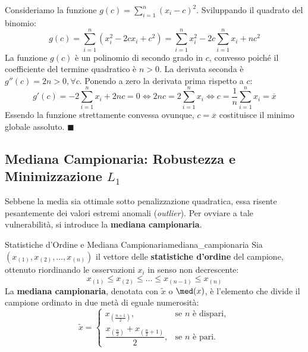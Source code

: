 \begin{dimostrazione}
Consideriamo la funzione $g(c) = \sum_{i=1}^n (x_i - c)^2$. Sviluppando il quadrato del binomio:
\begin{equation}
g(c) = \sum_{i=1}^n \left(x_i^2 - 2c x_i + c^2\right) = \sum_{i=1}^n x_i^2 - 2c \sum_{i=1}^n x_i + n c^2
\end{equation}
La funzione $g(c)$ è un polinomio di secondo grado in $c$, convesso poiché il coefficiente del termine quadratico è $n > 0$. La derivata seconda è $g''(c) = 2n > 0, \forall c$. Ponendo a zero la derivata prima rispetto a $c$:
\begin{equation}
g'(c) = -2\sum_{i=1}^n x_i + 2nc = 0 \iff 2nc = 2\sum_{i=1}^n x_i \iff c = \frac{1}{n}\sum_{i=1}^n x_i = \overline{x}
\end{equation}
Essendo la funzione strettamente convessa ovunque, $c = \overline{x}$ costituisce il minimo globale assoluto. $\blacksquare$
\end{dimostrazione}

\subsection{Mediana Campionaria: Robustezza e Minimizzazione $L_1$}

Sebbene la media sia ottimale sotto penalizzazione quadratica, essa risente pesantemente dei valori estremi anomali (\emph{outlier}). Per ovviare a tale vulnerabilità, si introduce la \textbf{mediana campionaria}.

\begin{definizione}{Statistiche d'Ordine e Mediana Campionaria}{mediana_campionaria}
Sia $(x_{(1)}, x_{(2)}, \dots, x_{(n)})$ il vettore delle \textbf{statistiche d'ordine} del campione, ottenuto riordinando le osservazioni $x_i$ in senso non decrescente:
\begin{equation}
x_{(1)} \le x_{(2)} \le \dots \le x_{(n-1)} \le x_{(n)}
\end{equation}
La \textbf{mediana campionaria}, denotata con $\widetilde{x}$ o $\med(x)$, è l'elemento che divide il campione ordinato in due metà di eguale numerosità:
\begin{equation}
\widetilde{x} = \begin{cases}
x_{\left(\frac{n+1}{2}\right)}, & \text{se } n \text{ è dispari}, \\[8pt]
\dfrac{x_{\left(\frac{n}{2}\right)} + x_{\left(\frac{n}{2}+1\right)}}{2}, & \text{se } n \text{ è pari}.
\end{cases}
\end{equation}
\end{definizione}

